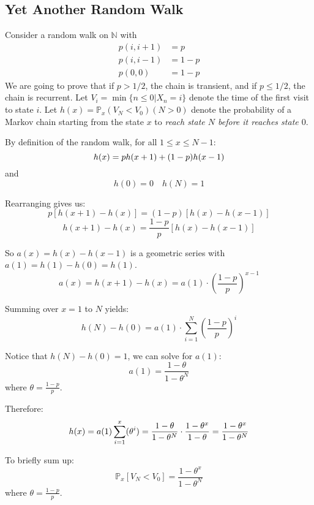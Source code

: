     \subsection{Yet Another Random Walk}
    Consider a random walk on $\mathbb{N}$ with
    \begin{align*}
        p(i,i+1) &= p\\
        p(i,i-1) &= 1-p\\
        p(0,0) &= 1-p
    \end{align*}
    We are going to prove that if $p > 1/2$, the chain is transient, and if $p \le 1/2$, the chain is recurrent.
    Let $V_i = \min\{ n\le0 | X_n = i \}$ denote the time of the first visit to state $i$. 
    Let $h(x) = \mathbb{P}_x(V_N<V_0) (N > 0)$ denote the probability of a Markov chain starting from the state $x$ to \emph{reach state $N$ before it reaches state $0$}.

    By definition of the random walk, for all $1 \le x \le N-1$:
    \begin{equation}
        \notag
        h(x) = ph(x+1) + (1-p)h(x-1)
    \end{equation}
    and
    \[ h(0) = 0 \quad h(N) = 1 \]

    Rearranging gives us:
    \begin{equation}
        \label{eq3.1}
        p[h(x+1) - h(x)] = (1-p)[h(x) - h(x-1)]
    \end{equation}
    \[ h(x+1) - h(x) = \frac{1-p}{p}[h(x) - h(x-1)] \]

    So $a(x) = h(x) - h(x-1)$ is a geometric series with $a(1) = h(1) - h(0) = h(1)$.
    \[ a(x) = h(x+1) - h(x) = a(1) \cdot (\frac{1-p}{p})^{x-1} \]

    Summing over $x = 1$ to $N$ yields: 
    \[ h(N) - h(0) = a(1) \cdot \sum_{i = 1}^{N}(\frac{1-p}{p})^i \]

    Notice that $h(N) - h(0) = 1$, we can solve for $a(1)$:
    \[ a(1) = \frac{1-\theta}{1-\theta^N} \]
    where $\theta = \frac{1-p}{p}$.

    Therefore:
    \begin{equation}
        \notag
        h(x) = a(1)\sum_{i=1}^{x}(\theta^i) = \frac{1-\theta}{1-\theta^N} \cdot \frac{1-\theta^x}{1-\theta} = \frac{1-\theta^x}{1-\theta^N}
    \end{equation}

    To briefly sum up:
    \begin{equation}
        \label{eq3.2}
        \mathbb{P}_x[V_N < V_0] = \frac{1-\theta^x}{1-\theta^N}
    \end{equation}
    where $\theta = \frac{1-p}{p}$.

